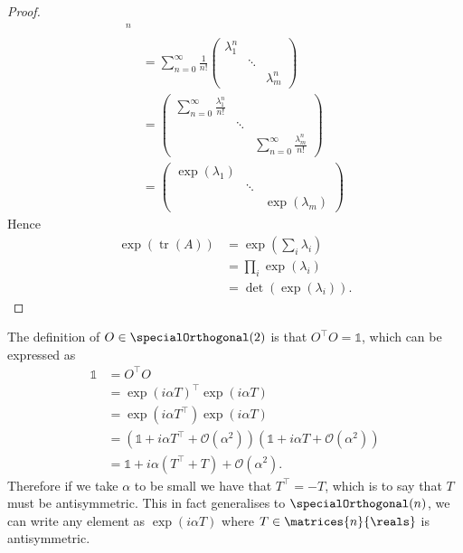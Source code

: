 \documentclass[fleqn]{NotesClass}
\newcommand*{\trans}{\top}
\newcommand*{\ident}{\mathbb{1}}
\DeclareMathOperator{\tr}{tr}
\newcommand*{\order}{\mathcal{O}}
\begin{document}
\begin{lma}{}{}
\begin{proof}
\begin{align}
                ^n\\
                &= \sum_{n = 0}^{\infty} \frac{1}{n!}
                \begin{pmatrix}
                    \lambda_1^n && \\
                    & \ddots & \\
                    && \lambda_m^n
                \end{pmatrix}
                \\
                &= 
                \begin{pmatrix}
                    \sum_{n = 0}^{\infty} \frac{\lambda_1^n}{n!} && \\
                    & \ddots & \\
                    && \sum_{n = 0}^{\infty} \frac{\lambda_m^n}{n!}
                \end{pmatrix}
                \\
                &= 
                \begin{pmatrix}
                    \exp(\lambda_1) && \\
                    & \ddots & \\
                    && \exp(\lambda_m)
                \end{pmatrix}
            \end{align}
            \endgroup
            Hence
            \begin{align}
                \exp(\tr(A)) &= \exp\left( \sum_{i} \lambda_i \right)\\
                &= \prod_{i} \exp(\lambda_i)\\
                &= \det(\exp(\lambda_i)).
            \end{align}
        \end{proof}
    \end{lma}
    
    The definition of \(O \in \specialOrthogonal(2)\) is that \(O^\trans O = \ident\), which can be expressed as
    \begin{align}
        \ident &= O^\trans O\\
        &= \exp(i\alpha T)^{\trans} \exp(i\alpha T)\\
        &= \exp(i\alpha T^{\trans}) \exp(i\alpha T)\\
        &= (\ident + i\alpha T^{\trans} + \order(\alpha^2))(\ident + i\alpha T + \order(\alpha^2))\\
        &= \ident + i\alpha(T^\trans + T) + \order(\alpha^2).
    \end{align}
    Therefore if we take \(\alpha\) to be small we have that \(T^{\trans} = -T\), which is to say that \(T\) must be antisymmetric.
    This in fact generalises to \(\specialOrthogonal(n)\), we can write any element as \(\exp(i\alpha T)\) where \(T \in \matrices{n}{\reals}\) is antisymmetric.
    
\end{document}
